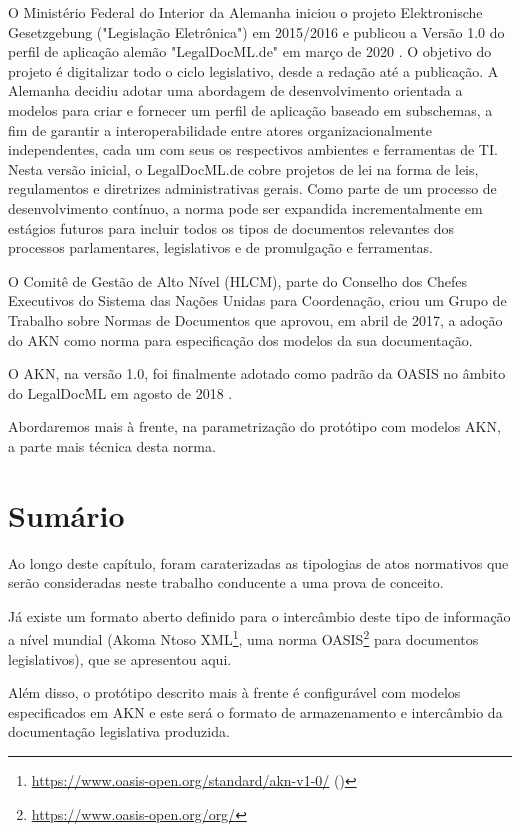 O Ministério Federal do Interior da Alemanha iniciou o projeto Elektronische Gesetzgebung ("Legislação Eletrônica") 
em 2015/2016 \cite{EGesetzgebung} e publicou a Versão 1.0 do perfil de aplicação alemão "LegalDocML.de" em março de 2020
\cite{LegalDocMLDE, Flatt2022}. 
O objetivo do projeto é digitalizar todo o ciclo legislativo, desde a redação até a publicação. 
A Alemanha decidiu adotar uma abordagem de desenvolvimento orientada a modelos para criar e fornecer um perfil de 
aplicação baseado em subschemas, a fim de garantir a interoperabilidade entre atores organizacionalmente independentes, 
cada um com seus os respectivos ambientes e ferramentas de TI. 
Nesta versão inicial, o LegalDocML.de cobre projetos de lei na forma de leis, regulamentos e diretrizes administrativas gerais. 
Como parte de um processo de desenvolvimento contínuo, a norma pode ser expandida incrementalmente em estágios futuros para 
incluir todos os tipos de documentos relevantes dos processos parlamentares, legislativos e de promulgação e ferramentas.

O Comitê de Gestão de Alto Nível  (HLCM), parte do Conselho dos Chefes Executivos do Sistema das Nações Unidas para Coordenação, 
criou um Grupo de Trabalho sobre Normas de Documentos que aprovou, em abril de 2017, a adoção do AKN como norma 
para especificação dos modelos da sua documentação.

O AKN, na versão 1.0, foi finalmente adotado como padrão da OASIS no âmbito do LegalDocML em 
agosto de 2018 \cite{AkomaNtosoStandard2020}.

Abordaremos mais à frente, na parametrização do protótipo com modelos AKN, a parte mais técnica desta norma.

\section{Sumário}

Ao longo deste capítulo, foram caraterizadas as tipologias de atos normativos que serão 
consideradas neste trabalho conducente a uma prova de conceito.

Já existe um formato aberto definido para o intercâmbio deste tipo de informação a nível mundial 
(Akoma Ntoso XML\footnote{\url{https://www.oasis-open.org/standard/akn-v1-0/} (\cite{AkomaNtoso2018})}, 
uma norma OASIS\footnote{\url{https://www.oasis-open.org/org/}} para documentos legislativos), que se apresentou aqui.

Além disso, o protótipo descrito mais à frente é configurável com modelos especificados em AKN e este será o formato de 
armazenamento e intercâmbio da documentação legislativa produzida.



